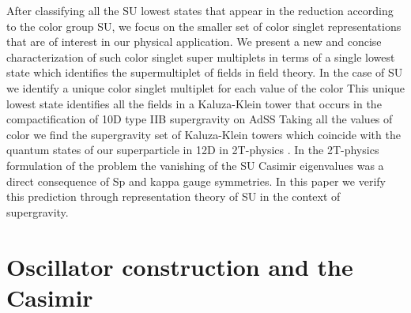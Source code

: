 \documentclass[a4paper,aps,preprint,nofootinbib]{revtex4}
\begin{document}
After classifying all the SU\coordHE{} lowest states that appear in the
reduction according to the color group SU\coordHE{}, we focus on the
smaller set of color singlet representations that are of interest in our
physical application. We present a new and concise characterization of such
color singlet super multiplets in terms of a single lowest state which
identifies the supermultiplet of fields in field theory. In the case of SU\coordHE{} we identify a unique color singlet multiplet for each
value of the color \coordHE{} This unique lowest state identifies all the fields
in a Kaluza-Klein tower that occurs in the compactification of 10D type IIB
supergravity on AdS\coordHE{}S\coordHE{} Taking all the values of color \coordHE{} we find the supergravity set of Kaluza-Klein towers
which coincide with the quantum states of our superparticle in 12D in
2T-physics \cite{AdS5S5}. In the 2T-physics formulation of the problem the
vanishing of the SU\coordHE{} Casimir eigenvalues was a direct
consequence of Sp\myHighlight{$\left( 2\right) $}\coordHE{} and kappa gauge symmetries. In this
paper we verify this prediction through representation theory of SU\coordHE{} in the context of supergravity.

\section{Oscillator construction and the Casimir}
\end{document}
